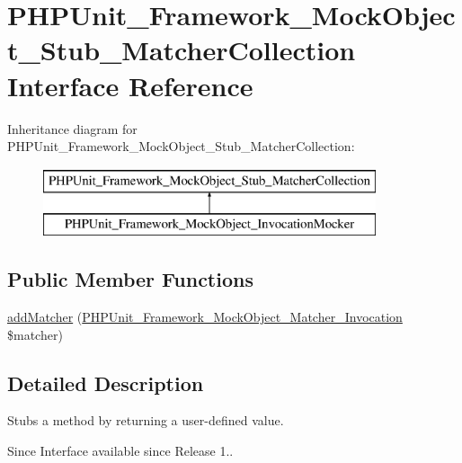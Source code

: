 \hypertarget{interface_p_h_p_unit___framework___mock_object___stub___matcher_collection}{}\section{P\+H\+P\+Unit\+\_\+\+Framework\+\_\+\+Mock\+Object\+\_\+\+Stub\+\_\+\+Matcher\+Collection Interface Reference}
\label{interface_p_h_p_unit___framework___mock_object___stub___matcher_collection}
Inheritance diagram for P\+H\+P\+Unit\+\_\+\+Framework\+\_\+\+Mock\+Object\+\_\+\+Stub\+\_\+\+Matcher\+Collection\+:\begin{figure}[H]
\begin{center}
\leavevmode
\includegraphics[height=2.000000cm]{interface_p_h_p_unit___framework___mock_object___stub___matcher_collection}
\end{center}
\end{figure}
\subsection*{Public Member Functions}
\begin{DoxyCompactItemize}
\item 
\mbox{\hyperlink{interface_p_h_p_unit___framework___mock_object___stub___matcher_collection_aa69f965014eff38ff4c86a3e10a5420a}{add\+Matcher}} (\mbox{\hyperlink{interface_p_h_p_unit___framework___mock_object___matcher___invocation}{P\+H\+P\+Unit\+\_\+\+Framework\+\_\+\+Mock\+Object\+\_\+\+Matcher\+\_\+\+Invocation}} \$matcher)
\end{DoxyCompactItemize}


\subsection{Detailed Description}
Stubs a method by returning a user-\/defined value.

\begin{DoxySince}{Since}
Interface available since Release 1.. 
\end{DoxySince}


